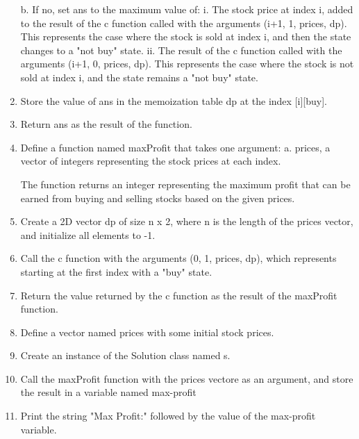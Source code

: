 \documentclass{article}
\begin{document}
\begin{enumerate}
           b. If no, set ans to the maximum value of:
              i. The stock price at index i, added to the result of the c function called with the arguments (i+1, 1, prices, dp).
                 This represents the case where the stock is sold at index i, and then the state changes to a "not buy" state.
              ii. The result of the c function called with the arguments (i+1, 0, prices, dp).
                 This represents the case where the stock is not sold at index i, and the state remains a "not buy" state.
        
        \item Store the value of ans in the memoization table dp at the index [i][buy].
        
        \item Return ans as the result of the function.
        
        \item Define a function named maxProfit that takes one argument:
           a. prices, a vector of integers representing the stock prices at each index.
        
           The function returns an integer representing the maximum profit that can be earned from buying and selling stocks based on the given prices.
        
        \item Create a 2D vector dp of size n x 2, where n is the length of the prices vector, and initialize all elements to -1.
        
        \item Call the c function with the arguments (0, 1, prices, dp), which represents starting at the first index with a "buy" state.
        
        \item Return the value returned by the c function as the result of the maxProfit function.
        
        \item Define a vector named prices with some initial stock prices.
        
        \item Create an instance of the Solution class named s.
        \item Call the maxProfit function with the prices vectore as an argument, and store the result in a variable named max-profit
        \item Print the string "Max Profit:" followed by the value of the max-profit variable.
        
     \end{enumerate}
     
\end{document}
